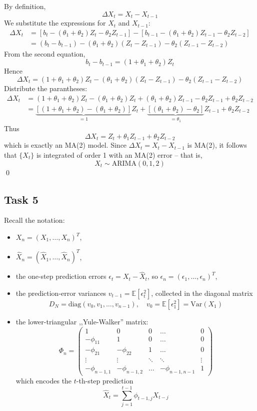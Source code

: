 \documentclass[11pt,a4paper]{article}
\newcommand{\EE}{\mathbb E}
\newcommand{\var}{\mathrm{Var}}
\begin{document}
    By definition,
    \[ \Delta X_t = X_t - X_{t-1} \]
    We substitute the expressions for $X_t$ and $X_{t-1}$:
    \begin{align*}
        \Delta X_t &= [b_t - (\theta_1 + \theta_2) Z_t - \theta_2 Z_{t-1}] - [ b_{t-1} - (\theta_1 + \theta_2) Z_{t-1} - \theta_2 Z_{t-2} ] \\
        &= (b_t - b_{t-1}) - (\theta_1 + \theta_2) (Z_t - Z_{t-1}) - \theta_2 (Z_{t-1} - Z_{t-2})
    \end{align*}
    From the second equation,
    \[ b_t - b_{t-1} = (1+\theta_1 + \theta_2) Z_t \]
    Hence
    \[ \Delta X_t = (1+\theta_1+\theta_2) Z_t - (\theta_1 + \theta_2) (Z_t-Z_{t-1}) - \theta_2 (Z_{t-1} - Z_{t-2}) \]
    Distribute the parantheses:
    \begin{align*}
        \Delta X_t &= (1+\theta_1 + \theta_2) Z_t - (\theta_1+\theta_2) Z_t + (\theta_1 + \theta_2) Z_{t-1} - \theta_2 Z_{t-1} + \theta_2 Z_{t-2} \\
        &= \underbrace{[(1+\theta_1 + \theta_2) - (\theta_1 + \theta_2)]}_{=1} Z_t + \underbrace{[(\theta_1 + \theta_2) - \theta_2]}_{=\theta_1} Z_{t-1} + \theta_2 Z_{t-2}
    \end{align*}
    Thus
    \[ \Delta X_t = Z_t + \theta_1 Z_{t-1} + \theta_2 Z_{t-2} \]
    which is exactly an MA(2) model. Since $\Delta X_t = X_t - X_{t-1}$ is MA(2), it follows that $\{X_t\}$ is integrated of order 1 with an MA(2) error -- that is,
    \[ X_t \sim \mathrm{ARIMA}(0,1,2) \] \qed

    \subsection*{Task 5}
    Recall the notation:
    \begin{itemize}
        \item $X_n = (X_1, \ldots, X_n)^T$,
        \item $\hat X_n = (\hat X_1, \ldots, \hat X_n)^T$,
        \item the one-step prediction errors
        $ \epsilon_t = X_t - \hat X_t$, 
        so $\epsilon_n = (\epsilon_1, \ldots, \epsilon_n)^T$,
        \item the prediction-error variances
        $ v_{t-1} = \EE[\epsilon_t^2]$,
        collected in the diagonal matrix
        \[ D_N = \mathrm{diag} (v_0, v_1, \ldots, v_{n-1}), \quad v_0 = \EE[\epsilon_1^2] = \var(X_1) \]
        \item the lower-triangular ,,Yule-Walker'' matrix:
        \[ \Phi_n = \begin{pmatrix} 1 & 0 & 0 & \ldots & 0 \\
            -\phi_{11} & 1 & 0 & \ldots & 0 \\
            -\phi_{21} & -\phi_{22} & 1 & \ldots & 0 \\
            \vdots & \vdots & \ddots & \ddots & \vdots \\
            -\phi_{n-1,1} & -\phi_{n-1,2} & \ldots & -\phi_{n-1, n-1} & 1 \end{pmatrix} \]
        which encodes the $t$-th-step prediction
        \[ \hat X_t = \sum_{j=1}^{t-1} \phi_{t-1, j} X_{t-j} \]
    \end{itemize}
    
\end{document}

